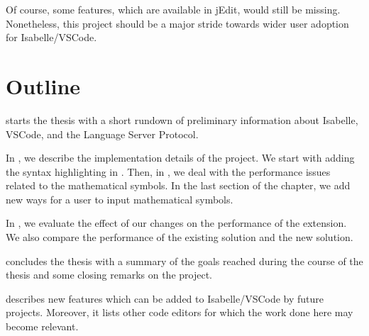 Of course, some features, which are available in jEdit, would still be missing. Nonetheless, this project should be a major stride towards wider user adoption for Isabelle/VSCode.

\section{Outline}
 starts the thesis with a short rundown of preliminary information about Isabelle, VSCode, and the Language Server Protocol.

In , we describe the implementation details of the project. We start with adding the syntax highlighting in . Then, in , we deal with the performance issues related to the mathematical symbols. In the last section of the chapter, we add new ways for a user to input mathematical symbols.

In , we evaluate the effect of our changes on the performance of the extension. We also compare the performance of the existing solution and the new solution.


 concludes the thesis with a summary of the goals reached during the course of the thesis and some closing remarks on the project.

 describes new features which can be added to Isabelle/VSCode by future projects. Moreover, it lists other code editors for which the work done here may become relevant.